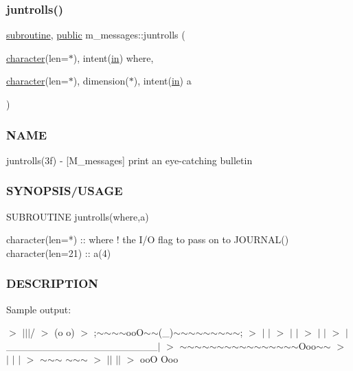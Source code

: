 \subsubsection{\texorpdfstring{juntrolls()}{juntrolls()}}
{\footnotesize\ttfamily \hyperlink{M__stopwatch_83_8txt_acfbcff50169d691ff02d4a123ed70482}{subroutine}, \hyperlink{M__stopwatch_83_8txt_a2f74811300c361e53b430611a7d1769f}{public} m\+\_\+messages\+::juntrolls (\begin{DoxyParamCaption}\item[{\hyperlink{option__stopwatch_83_8txt_abd4b21fbbd175834027b5224bfe97e66}{character}(len=$\ast$), intent(\hyperlink{M__journal_83_8txt_afce72651d1eed785a2132bee863b2f38}{in})}]{where,  }\item[{\hyperlink{option__stopwatch_83_8txt_abd4b21fbbd175834027b5224bfe97e66}{character}(len=$\ast$), dimension($\ast$), intent(\hyperlink{M__journal_83_8txt_afce72651d1eed785a2132bee863b2f38}{in})}]{a }\end{DoxyParamCaption})}



\subsubsection*{N\+A\+ME}

juntrolls(3f) -\/ \mbox{[}M\+\_\+messages\mbox{]} print an eye-\/catching bulletin 

\subsubsection*{S\+Y\+N\+O\+P\+S\+I\+S/\+U\+S\+A\+GE}

\begin{DoxyVerb}  SUBROUTINE juntrolls(where,a)

   character(len=*)  :: where  ! the I/O flag to pass on to JOURNAL()
   character(len=21) :: a(4)
\end{DoxyVerb}


\subsubsection*{D\+E\+S\+C\+R\+I\+P\+T\+I\+ON}

Sample output\+:

$>$ $|$$\vert$$\vert$/ $>$ (o o) $>$ ;$\sim$$\sim$$\sim$$\sim$oo\+O$\sim$$\sim$(\+\_\+)$\sim$$\sim$$\sim$$\sim$$\sim$$\sim$$\sim$$\sim$$\sim$; $>$ $\vert$ $\vert$ $>$ $\vert$ $\vert$ $>$ $\vert$ $\vert$ $>$ $\vert$\+\_\+\+\_\+\+\_\+\+\_\+\+\_\+\+\_\+\+\_\+\+\_\+\+\_\+\+\_\+\+\_\+\+\_\+\+\_\+\+\_\+\+\_\+\+\_\+\+\_\+\+\_\+\+\_\+\+\_\+\+\_\+$\vert$ $>$ \textquotesingle{}$\sim$$\sim$$\sim$$\sim$$\sim$$\sim$$\sim$$\sim$$\sim$$\sim$$\sim$$\sim$$\sim$$\sim$$\sim$$\sim$\+Ooo$\sim$$\sim$\textquotesingle{} $>$ $\vert$ $\vert$ $\vert$ $>$ $\sim$$\sim$$\sim$ $\sim$$\sim$$\sim$ $>$ $\vert$$\vert$ $\vert$$\vert$ $>$ ooO Ooo

